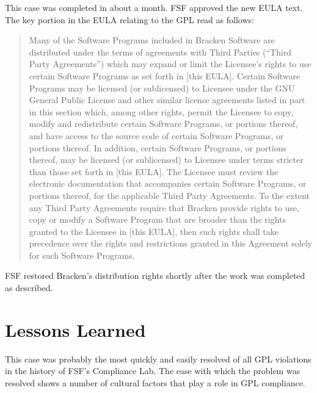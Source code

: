 This case was completed in about a month. FSF approved the new EULA
text. The key portion in the EULA relating to the GPL read as follows:

\begin{quotation}
Many of the Software Programs included in Bracken Software are distributed
under the terms of agreements with Third Parties (``Third Party
Agreements'') which may expand or limit the Licensee's rights to use
certain Software Programs as set forth in [this EULA]. Certain Software
Programs may be licensed (or sublicensed) to Licensee under the GNU
General Public License and other similar license agreements listed in part
in this section which, among other rights, permit the Licensee to copy,
modify and redistribute certain Software Programs, or portions thereof,
and have access to the source code of certain Software Programs, or
portions thereof. In addition, certain Software Programs, or portions
thereof, may be licensed (or sublicensed) to Licensee under terms stricter
than those set forth in [this EULA]. The Licensee must review the
electronic documentation that accompanies certain Software Programs, or
portions thereof, for the applicable Third Party Agreements. To the
extent any Third Party Agreements require that Bracken provide rights to
use, copy or modify a Software Program that are broader than the rights
granted to the Licensee in [this EULA], then such rights shall take
precedence over the rights and restrictions granted in this Agreement
solely for such Software Programs.
\end{quotation}

FSF restored Bracken's distribution rights shortly after the work was
completed as described.

\section{Lessons Learned}

This case was probably the most quickly and easily resolved of all GPL
violations in the history of FSF's Compliance Lab. The ease with which
the problem was resolved shows a number of cultural factors that play a
role in GPL compliance.

